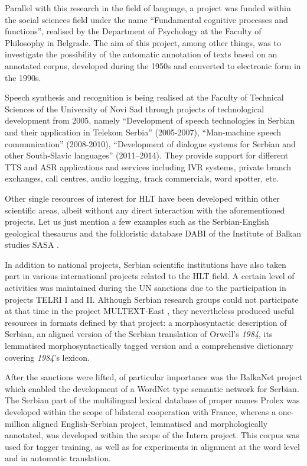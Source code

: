 \begin{multicols}{2}
Parallel with this research in the field of language, a project was funded within the social sciences field under the name “Fundamental cognitive processes and functions”, realised by the Department of Psychology at the Faculty of Philosophy in Belgrade. The aim of this project, among other things, was to investigate the possibility of the automatic annotation of texts based on an annotated corpus, \cite{SRB_KORPUS} developed during the 1950s and converted to electronic form in the 1990s. 

Speech synthesis and recognition is being realised at the Faculty of Technical Sciences of the University of Novi Sad through projects of technological development from 2005, namely “Development of speech technologies in Serbian and their application in Telekom Serbia” (2005-2007), “Man-machine speech communication” (2008-2010), “Development of dialogue systems for Serbian and other South-Slavic languages” (2011--2014). They provide support for different TTS and ASR applications and services including IVR systems, private branch exchanges, call centres, audio logging, track commercials, word spotter, etc.
 
Other single resources of interest for HLT have been developed within other scientific areas, albeit without any direct interaction with the aforementioned projects. Let us just mention a few examples such as the Serbian-English geological thesaurus \cite{RGF} and the folkloristic database DABI of the Institute of Balkan studies SASA \cite{BALKANINSTITUT}.

In addition to national projects, Serbian scientific institutions have also taken part in various international projects related to the HLT field. A certain level of activities was maintained during the UN sanctions due to the participation in projects TELRI I and II. \cite{TELRI} Although Serbian research groups could not participate at that time in the project MULTEXT-East \cite{NL}, they nevertheless produced useful resources in formats defined by that project: a morphosyntactic description of Serbian, an aligned version of the Serbian translation of Orwell’s \textit{1984}, its lemmatised morphosyntactically tagged version and a comprehensive dictionary covering \textit{1984}'s lexicon. 

After the sanctions were lifted, of particular importance was the BalkaNet \cite{CORDIS} project which enabled the development of a WordNet type semantic network for Serbian. The Serbian part of the multilingual lexical database of proper names Prolex \cite{CNRTL} was developed within the scope of bilateral cooperation with France, whereas a one-million aligned English-Serbian project, lemmatised and morphologically annotated, was developed within the scope of the Intera project.  This corpus was used for tagger training, as well as for experiments in alignment at the word level and in automatic translation.
 

\end{multicols}
